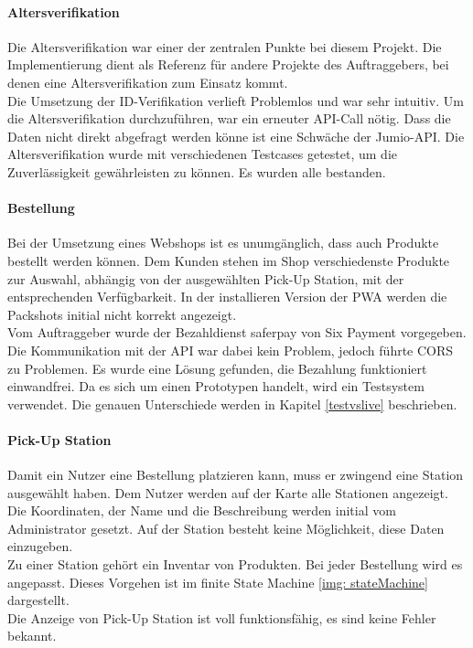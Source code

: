 \paragraph{Altersverifikation}
Die Altersverifikation war einer der zentralen Punkte bei diesem Projekt. Die Implementierung dient als Referenz für andere Projekte des Auftraggebers, bei denen eine Altersverifikation zum Einsatz kommt. \\
Die Umsetzung der ID-Verifikation verlieft Problemlos und war sehr intuitiv. Um die Altersverifikation durchzuführen, war ein erneuter API-Call nötig. Dass die Daten nicht direkt abgefragt werden könne ist eine Schwäche der Jumio-API. Die Altersverifikation wurde mit verschiedenen Testcases getestet, um die Zuverlässigkeit gewährleisten zu können. Es wurden alle bestanden. 

\paragraph{Bestellung}
Bei der Umsetzung eines Webshops ist es unumgänglich, dass auch Produkte bestellt werden können. Dem Kunden stehen im Shop verschiedenste Produkte zur Auswahl, abhängig von der ausgewählten Pick-Up Station, mit der entsprechenden Verfügbarkeit. In der installieren Version der \ac{PWA} werden die Packshots initial nicht korrekt angezeigt. \\Vom Auftraggeber wurde der Bezahldienst saferpay von Six Payment vorgegeben. Die Kommunikation mit der API war dabei kein Problem, jedoch führte \ac{CORS} zu Problemen. Es wurde eine Lösung gefunden, die Bezahlung funktioniert einwandfrei. Da es sich um einen Prototypen handelt, wird ein Testsystem verwendet. Die genauen Unterschiede werden in Kapitel \ref{testvslive} beschrieben. 

\paragraph{Pick-Up Station}
Damit ein Nutzer eine Bestellung platzieren kann, muss er zwingend eine Station ausgewählt haben. Dem Nutzer werden auf der Karte alle Stationen angezeigt. Die Koordinaten, der Name und die Beschreibung werden initial vom Administrator gesetzt. Auf der Station besteht keine Möglichkeit, diese Daten einzugeben. \\Zu einer Station gehört ein Inventar von Produkten. Bei jeder Bestellung wird es angepasst. Dieses Vorgehen ist im finite State Machine \ref{img: stateMachine} dargestellt.\\
Die Anzeige von Pick-Up Station ist voll funktionsfähig, es sind keine Fehler bekannt. 

